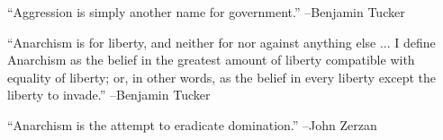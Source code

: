 \documentclass{article}%
\begin{document}
\linebreak%
\vspace{1mm}%
\begin{minipage}{\textwidth}%
\flushleft%
“Aggression is simply another name for government.”%
\linebreak%
\vspace{1mm}%
–Benjamin Tucker%
\linebreak%
\vspace{1mm}%
\end{minipage}%
\linebreak%
\vspace{1mm}%
\begin{minipage}{\textwidth}%
\flushleft%
“Anarchism is for liberty, and neither for nor against anything else ... I define Anarchism as the belief in the greatest amount of liberty compatible with equality of liberty; or, in other words, as the belief in every liberty except the liberty to invade.”%
\linebreak%
\vspace{1mm}%
–Benjamin Tucker%
\linebreak%
\vspace{1mm}%
\end{minipage}%
\linebreak%
\vspace{1mm}%
\begin{minipage}{\textwidth}%
\flushleft%
“Anarchism is the attempt to eradicate domination.”%
\linebreak%
\vspace{1mm}%
–John Zerzan%
\linebreak%
\vspace{1mm}%
\end{minipage}%
\linebreak%
\vspace{1mm}

%
\end{document}
